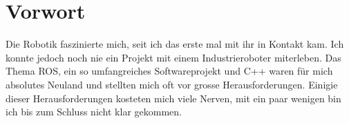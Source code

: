 
\chapter*{Vorwort}
\label{sec:Vorwort}
Die Robotik faszinierte mich, seit ich das erste mal mit ihr in Kontakt kam. Ich konnte jedoch noch nie ein Projekt mit einem Industrieroboter miterleben. Das Thema ROS, ein so umfangreiches Softwareprojekt und C++ waren für mich absolutes Neuland und stellten mich oft vor grosse Herausforderungen. Einigie dieser Herausforderungen kosteten mich viele Nerven, mit ein paar wenigen bin ich bis zum Schluss nicht klar gekommen. \\
\\


